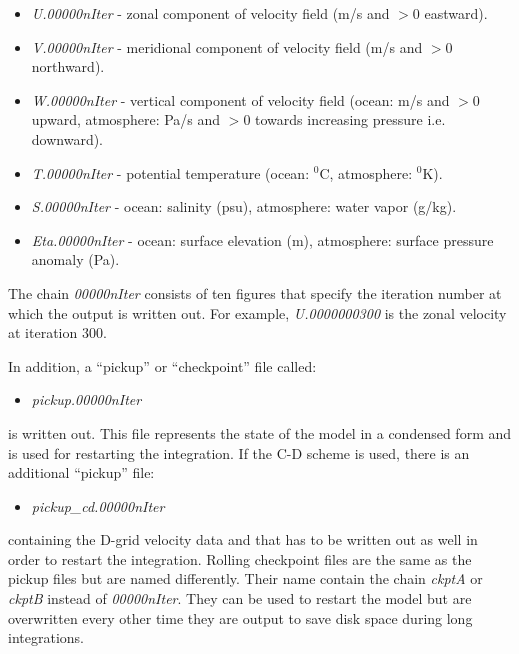 \begin{itemize}
\item \textit{U.00000nIter} - zonal component of velocity field (m/s and $>
0 $ eastward).

\item \textit{V.00000nIter} - meridional component of velocity field (m/s
and $> 0$ northward).

\item \textit{W.00000nIter} - vertical component of velocity field (ocean:
m/s and $> 0$ upward, atmosphere: Pa/s and $> 0$ towards increasing pressure
i.e. downward).

\item \textit{T.00000nIter} - potential temperature (ocean: $^{0}$C,
atmosphere: $^{0}$K).

\item \textit{S.00000nIter} - ocean: salinity (psu), atmosphere: water vapor
(g/kg).

\item \textit{Eta.00000nIter} - ocean: surface elevation (m), atmosphere:
surface pressure anomaly (Pa).
\end{itemize}

The chain \textit{00000nIter} consists of ten figures that specify the
iteration number at which the output is written out. For example, \textit{%
U.0000000300} is the zonal velocity at iteration 300.

In addition, a ``pickup'' or ``checkpoint'' file called:

\begin{itemize}
\item \textit{pickup.00000nIter}
\end{itemize}

is written out. This file represents the state of the model in a condensed
form and is used for restarting the integration. If the C-D scheme is used,
there is an additional ``pickup'' file:

\begin{itemize}
\item \textit{pickup\_cd.00000nIter}
\end{itemize}

containing the D-grid velocity data and that has to be written out as well
in order to restart the integration. Rolling checkpoint files are the same
as the pickup files but are named differently. Their name contain the chain 
\textit{ckptA} or \textit{ckptB} instead of \textit{00000nIter}. They can be
used to restart the model but are overwritten every other time they are
output to save disk space during long integrations.



